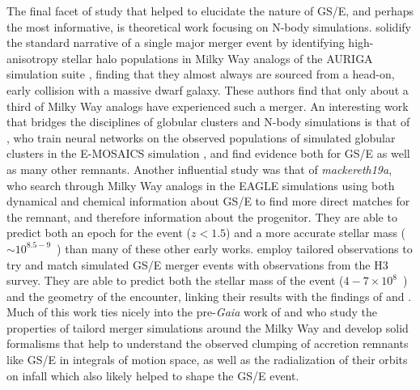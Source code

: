 The final facet of study that helped to elucidate the nature of GS/E, and perhaps the most informative, is theoretical work focusing on N-body simulations. \textcite{fattahi19} solidify the standard narrative of a single major merger event by identifying high-anisotropy stellar halo populations in Milky Way analogs of the AURIGA simulation suite \parencite{grand17}, finding that they almost always are sourced from a head-on, early collision with a massive dwarf galaxy. These authors find that only about a third of Milky Way analogs have experienced such a merger. An interesting work that bridges the disciplines of globular clusters and N-body simulations is that of \textcite{kruijssen20}, who train neural networks on the observed populations of simulated globular clusters in the E-MOSAICS simulation \parencite{kruijssen19}, and find evidence both for GS/E as well as many other remnants. Another influential study was that of \textit{mackereth19a}, who search through Milky Way analogs in the EAGLE simulations using both dynamical and chemical information about GS/E to find more direct matches for the remnant, and therefore information about the progenitor. They are able to predict both an epoch for the event ($z < 1.5$) and a more accurate stellar mass ($\sim 10^{8.5-9}$~\Msun) than many of these other early works. \textcite{naidu21} employ tailored observations to try and match simulated GS/E merger events with observations from the H3 survey. They are able to predict both the stellar mass of the event ($4-7 \times 10^{8}$~\Msun) and the geometry of the encounter, linking their results with the findings of \textcite{simion19} and \textcite{iorio19}. Much of this work ties nicely into the pre-\textit{Gaia} work of \textcite{amorisco17} and \textcite{jean-baptiste17} who study the properties of tailord merger simulations around the Milky Way and develop solid formalisms that help to understand the observed clumping of accretion remnants like GS/E in integrals of motion space, as well as the radialization of their orbits on infall which also likely helped to shape the GS/E event.

